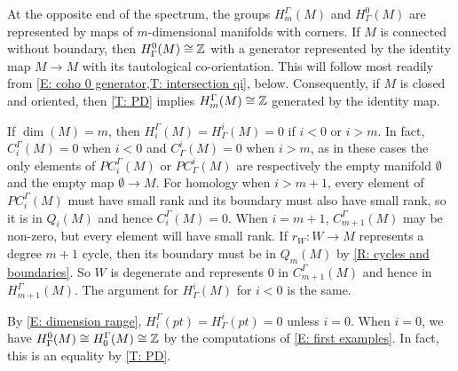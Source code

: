 \begin{example}
	At the opposite end of the spectrum, the groups $H_m^\Gamma(M)$ and $H^0_\Gamma(M)$ are represented by maps of $m$-dimensional manifolds with corners.
	If \(M\) is connected without boundary, then \(H^0_\Gamma(M) \cong \mathbb{Z}\) with a generator represented by the identity map \(M \to M\) with its tautological co-orientation.
	This will follow most readily from \cref{E: coho 0 generator,T: intersection qi}, below.
	Consequently, if $M$ is closed and oriented, then \cref{T: PD} implies $H_m^\Gamma(M) \cong \mathbb{Z}$ generated by the identity map.
\end{example}

\begin{example}\label{E: dimension range}
	If $\dim(M) = m$, then $H_i^\Gamma(M) = H^i_\Gamma(M) = 0$ if $i < 0$ or $i > m$.
	In fact, $C_i^\Gamma(M) = 0$ when $i<0$ and $C^i_\Gamma(M) = 0$ when $i > m$, as in these cases the only elements of $PC_i^\Gamma(M)$ or $PC^i_\Gamma(M)$ are respectively the empty manifold $\emptyset$ and the empty map $\emptyset \to M$.
	For homology when $i>m+1$, every element of $PC_i^\Gamma(M)$ must have small rank and its boundary must also have small rank, so it is in $Q_i(M)$ and hence $C_i^\Gamma(M) = 0$.
	When $i = m+1$, $C_{m+1}^\Gamma(M)$ may be non-zero, but every element will have small rank.
	If $r_W \colon W \to M$ represents a degree $m+1$ cycle, then its boundary must be in $Q_m(M)$ by \cref{R: cycles and boundaries}.
	So $W$ is degenerate and represents $0$ in $C_{m+1}^\Gamma(M)$ and hence in $H_{m+1}^\Gamma(M)$.
	The argument for $H^i_\Gamma(M)$ for $i<0$ is the same.
\end{example}



\begin{example}\label{E: dimension}
	By \cref{E: dimension range}, $H_i^\Gamma(pt) = H^i_\Gamma(pt) = 0$ unless $i = 0$.
	When $i = 0$, we have $H^0_\Gamma(M) \cong H_0^\Gamma(M) \cong \mathbb{Z}$ by the computations of \cref{E: first examples}.
	In fact, this is an equality by \cref{T: PD}.
\end{example}

